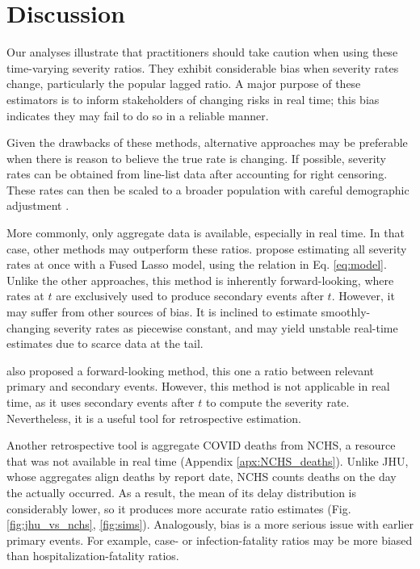 \documentclass{article}
\begin{document}
\section{Discussion}

Our analyses illustrate that practitioners should take caution when using these time-varying severity ratios. They exhibit considerable bias when severity rates change, particularly the popular lagged ratio. A major purpose of these estimators is to inform stakeholders of changing risks in real time; this bias indicates they may fail to do so in a reliable manner.

Given the drawbacks of these methods, alternative approaches may be preferable when there is reason to believe the true rate is changing. If possible, severity rates can be obtained from line-list data after accounting for right censoring. These rates can then be scaled to a broader population with careful demographic adjustment \citep{verity2020estimates}. 

More commonly, only aggregate data is available, especially in real time. In that case, other methods may outperform these ratios. \citet{fusedlasso} propose estimating all severity rates at once with a Fused Lasso model, using the relation in Eq. \ref{eq:model}. Unlike the other approaches, this method is inherently forward-looking, where rates at $t$ are exclusively used to produce secondary events after $t$. However, it may suffer from other sources of bias. It is inclined to estimate smoothly-changing severity rates as piecewise constant, and may yield unstable real-time estimates due to scarce data at the tail.

\citet{UKpaper} also proposed a forward-looking method, this one a ratio between relevant primary and secondary events. However, this method is not applicable in real time, as it uses secondary events after $t$ to compute the severity rate. Nevertheless, it is a useful tool for retrospective estimation. 

Another retrospective tool is aggregate COVID deaths from NCHS, a resource that was not available in real time (Appendix \ref{apx:NCHS_deaths}). Unlike JHU, whose aggregates align deaths by report date, NCHS counts deaths on the day the actually occurred. As a result, the mean of its delay distribution is considerably lower, so it produces more accurate ratio estimates (Fig. \ref{fig:jhu_vs_nchs}, \ref{fig:sims}). Analogously, bias is a more serious issue with earlier primary events. For example, case- or infection-fatality ratios may be more biased than hospitalization-fatality ratios. 
\end{document}
